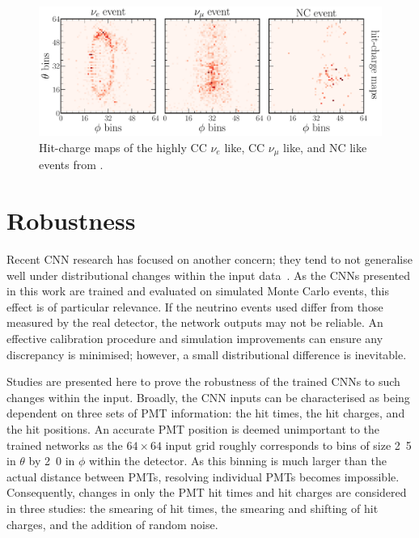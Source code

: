 \begin{figure} %
    \includegraphics[width=\textwidth]{diagrams/7-results/explain_beam_tsne_events.pdf}
    \caption[Hit-charge maps of highly CC $\nu_{e}$ like, CC $\nu_{\mu}$ like, and NC like events]
    {Hit-charge maps of the highly CC $\nu_{e}$ like, CC $\nu_{\mu}$ like, and NC like events from
        .}
    \label{fig:explain_beam_tsne_events}
\end{figure}

\section{Robustness} %
\label{sec:results_robust} %

Recent CNN research has focused on another concern; they tend to not generalise well under
distributional changes within the input data~\cite{djolonga2020}. As the CNNs presented in this
work are trained and evaluated on simulated Monte Carlo events, this effect is of particular
relevance. If the neutrino events used differ from those measured by the real \chipsfive detector,
the network outputs may not be reliable. An effective calibration procedure and simulation
improvements can ensure any discrepancy is minimised; however, a small distributional difference
is inevitable.

Studies are presented here to prove the robustness of the trained CNNs to such changes within the
input. Broadly, the CNN inputs can be characterised as being dependent on three sets of PMT
information: the hit times, the hit charges, and the hit positions. An accurate PMT position is
deemed unimportant to the trained networks as the $64 \times 64$ input grid roughly corresponds to
bins of size \unit{2.5}{} in $\theta$ by \unit{2.0}{} in $\phi$ within the
\chipsfive detector. As this binning is much larger than the actual distance between PMTs,
resolving individual PMTs becomes impossible. Consequently, changes in only the PMT hit times and
hit charges are considered in three studies: the smearing of hit times, the smearing and shifting
of hit charges, and the addition of random noise.

